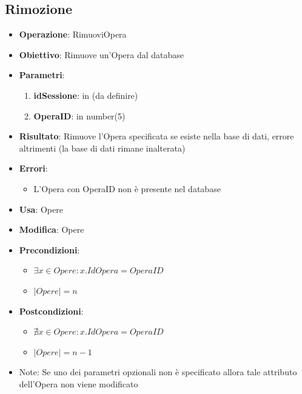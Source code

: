 \documentclass[a4paper,11pt]{article}
\begin{document}
\subsection{Rimozione}
\begin{itemize}
	\item \textbf{Operazione}: RimuoviOpera
	\item \textbf{Obiettivo}: Rimuove un'Opera dal database
	\item \textbf{Parametri}:
	\begin{enumerate}
		\item \textbf{idSessione}: in (da definire)
		\item \textbf{OperaID}: in number(5)
	\end{enumerate}
	\item \textbf{Risultato}: Rimuove l'Opera specificata se esiste nella base di dati, errore altrimenti (la base di dati rimane inalterata)
	\item \textbf{Errori}: 
	\begin{itemize}
		\item L'Opera con OperaID non è presente nel database
	\end{itemize}
	\item \textbf{Usa}: Opere
	\item \textbf{Modifica}: Opere
	\item \textbf{Precondizioni}:
	\begin{itemize}
		\item $\exists x \in Opere : x.IdOpera = OperaID$
		\item $|Opere| = n$
	\end{itemize}
	\item \textbf{Postcondizioni}:
	\begin{itemize}
		\item $\nexists x \in Opere : x.IdOpera = OperaID$
		\item $|Opere| = n - 1$
	\end{itemize}
	\item Note: Se uno dei parametri opzionali non è specificato allora tale attributo 
	dell'Opera non viene modificato
\end{itemize}

\end{document}
